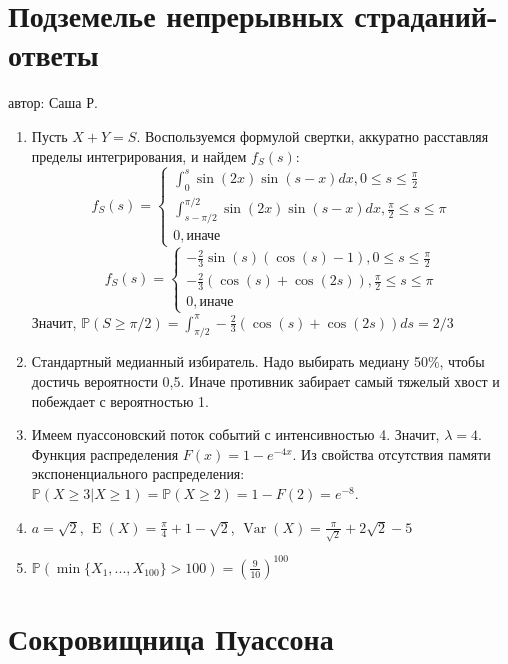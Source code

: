 \documentclass[a4paper,12pt]{article}
\DeclareMathOperator{\Var}{Var}
\DeclareMathOperator{\E}{E}
\def \P{\mathbb{P}}
\begin{document}
\newpage
\section{Подземелье непрерывных страданий-ответы}
автор: Саша Р.

\begin{enumerate}
\item Пусть $X+Y=S$. Воспользуемся формулой свертки, аккуратно расставляя пределы интегрирования, и найдем $f_S(s)$:
    \[f_S(s)=\begin{cases}\int^s_0\sin(2x)\sin(s-x)dx,0\leq s\leq \frac{\pi}{2} \\
    \int^{\pi/2}_{s-\pi/2}\sin(2x)\sin(s-x)dx, \frac{\pi}{2} \leq s \leq \pi\\
    0, \mbox{иначе}
    \end{cases}\]
    \[f_S(s)=\begin{cases}-\frac{2}{3}\sin(s)(\cos(s)-1),0\leq s\leq \frac{\pi}{2} \\
    -\frac{2}{3}(\cos(s)+\cos(2s)), \frac{\pi}{2} \leq s \leq \pi\\
    0, \mbox{иначе}
    \end{cases}\]
    Значит, $\P(S\geq\pi/2)=\int^{\pi}_{\pi/2}-\frac{2}{3}(\cos(s)+\cos(2s))ds=2/3$
\item Стандартный медианный избиратель. Надо выбирать медиану 50\%, чтобы достичь вероятности 0,5. Иначе противник забирает самый тяжелый хвост и побеждает с вероятностью 1.
\item Имеем пуассоновский поток событий с интенсивностью 4. Значит, $\lambda=4$. Функция распределения $F(x)=1-e^{-4x}$. Из свойства отсутствия памяти экспоненциального распределения: $\P(X\geq3|X\geq1)=\P(X\geq2)=1-F(2)=e^{-8}$.
\item $a=\sqrt{2}$, $\E(X)=\frac{\pi}{4}+1-\sqrt{2}$, $\Var(X)=\frac{\pi}{\sqrt{2}}+2\sqrt{2}-5$
\item $\P(\min\{X_1,...,X_{100}\}>100)=\left(\frac{9}{10}\right)^{100}$
\end{enumerate}






\newpage
\section{Сокровищница Пуассона}
\end{document}
